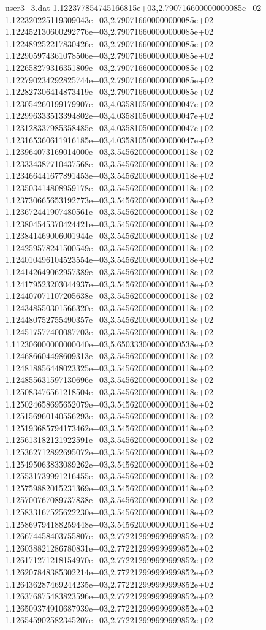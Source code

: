\begin{filecontents}{user3_3.dat}
1.122377854745166815e+03,2.790716600000000085e+02
1.122320225119309043e+03,2.790716600000000085e+02
1.122452130600292776e+03,2.790716600000000085e+02
1.122489252217830426e+03,2.790716600000000085e+02
1.122905974361078506e+03,2.790716600000000085e+02
1.122658279316351809e+03,2.790716600000000085e+02
1.122790234292825744e+03,2.790716600000000085e+02
1.122827306414873419e+03,2.790716600000000085e+02
1.123054260199179907e+03,4.035810500000000047e+02
1.122996333513394802e+03,4.035810500000000047e+02
1.123128337985358485e+03,4.035810500000000047e+02
1.123165360611916185e+03,4.035810500000000047e+02
1.123964073169014000e+03,3.545620000000000118e+02
1.123334387710437568e+03,3.545620000000000118e+02
1.123466441677891453e+03,3.545620000000000118e+02
1.123503414808959178e+03,3.545620000000000118e+02
1.123730665653192773e+03,3.545620000000000118e+02
1.123672441907480561e+03,3.545620000000000118e+02
1.123804545370424421e+03,3.545620000000000118e+02
1.123841469006001944e+03,3.545620000000000118e+02
1.124259578241500549e+03,3.545620000000000118e+02
1.124010496104523554e+03,3.545620000000000118e+02
1.124142649062957389e+03,3.545620000000000118e+02
1.124179523203044937e+03,3.545620000000000118e+02
1.124407071107205638e+03,3.545620000000000118e+02
1.124348550301566320e+03,3.545620000000000118e+02
1.124480752755490357e+03,3.545620000000000118e+02
1.124517577400087703e+03,3.545620000000000118e+02
1.112306000000000040e+03,5.650333000000000538e+02
1.124686604498609313e+03,3.545620000000000118e+02
1.124818856448023325e+03,3.545620000000000118e+02
1.124855631597130696e+03,3.545620000000000118e+02
1.125083476561218504e+03,3.545620000000000118e+02
1.125024658695652079e+03,3.545620000000000118e+02
1.125156960140556293e+03,3.545620000000000118e+02
1.125193685794173462e+03,3.545620000000000118e+02
1.125613182121922591e+03,3.545620000000000118e+02
1.125362712892695072e+03,3.545620000000000118e+02
1.125495063833089262e+03,3.545620000000000118e+02
1.125531739991216455e+03,3.545620000000000118e+02
1.125759882015231369e+03,3.545620000000000118e+02
1.125700767089737838e+03,3.545620000000000118e+02
1.125833167525622230e+03,3.545620000000000118e+02
1.125869794188259448e+03,3.545620000000000118e+02
1.126674458403755807e+03,2.772212999999999852e+02
1.126038821286780831e+03,2.772212999999999852e+02
1.126171271218154970e+03,2.772212999999999852e+02
1.126207848385302214e+03,2.772212999999999852e+02
1.126436287469244235e+03,2.772212999999999852e+02
1.126376875483823596e+03,2.772212999999999852e+02
1.126509374910687939e+03,2.772212999999999852e+02
1.126545902582345207e+03,2.772212999999999852e+02

\end{filecontents}
